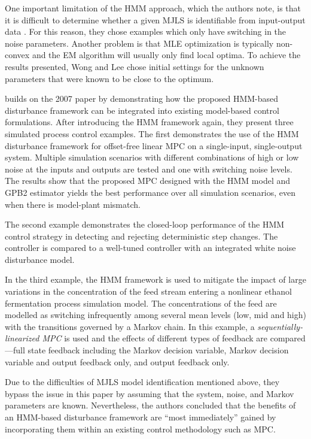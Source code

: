 One important limitation of the HMM approach, which the authors note, is that it is difficult to determine whether a given MJLS is identifiable from input-output data \citep{vidal_observability_2002}. For this reason, they chose examples which only have switching in the noise parameters. Another problem is that MLE optimization is typically non-convex and the EM algorithm will usually only find local optima. To achieve the results presented, Wong and Lee chose initial settings for the unknown parameters that were known to be close to the optimum.

\cite{wong_realistic_2009} builds on the 2007 paper by demonstrating how the proposed HMM-based disturbance framework can be integrated into existing model-based control formulations. After introducing the HMM framework again, they present three simulated process control examples. The first demonstrates the use of the HMM disturbance framework for offset-free linear MPC on a single-input, single-output system. Multiple simulation scenarios with different combinations of high or low noise at the inputs and outputs are tested and one with switching noise levels. The results show that the proposed MPC designed with the HMM model and GPB2 estimator yields the best performance over all simulation scenarios, even when there is model-plant mismatch.

The second example demonstrates the closed-loop performance of the HMM control strategy in detecting and rejecting deterministic step changes. The controller is compared to a well-tuned controller with an integrated white noise disturbance model.

In the third example, the HMM framework is used to mitigate the impact of large variations in the concentration of the feed stream entering a nonlinear ethanol fermentation process simulation model. The concentrations of the feed are modelled as switching infrequently among several mean levels (low, mid and high) with the transitions governed by a Markov chain. In this example, a \textit{sequentially-linearized MPC} \citep{lee_extended_1994} is used and the effects of different types of feedback are compared---full state feedback including the Markov decision variable, Markov decision variable and output feedback only, and output feedback only.

Due to the difficulties of MJLS model identification mentioned above, they bypass the issue in this paper by assuming that the system, noise, and Markov parameters are known. Nevertheless, the authors concluded that the benefits of an HMM-based disturbance framework are ``most immediately'' gained by incorporating them within an existing control methodology such as MPC.

